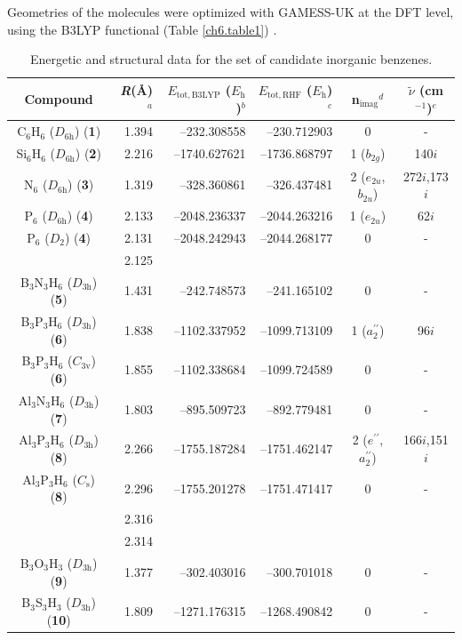 Geometries of the molecules were optimized with GAMESS-UK  \cite{gamess} at the
DFT level, using the B3LYP functional (Table \ref{ch6.table1}) \cite{b3lyp1,b3lyp2,b3lyp3}.
\begin{table}[htp]
\caption{Energetic and structural data for the set of candidate inorganic benzenes.}
\begin{center}
\begin{tabular}{c r r r c c}
\hline
\textbf{Compound}&
\textit{R}(\AA)${}^{a}$& 
$E_{\mathrm{tot,B3LYP}}$ ($E_{\mathrm{h}}$)${ }^{b}$&
$E_{\mathrm{tot,RHF}}$ ($E_{\mathrm{h}}$)${ }^{c}$ &
\mbox{n$_{\mathrm{imag}}$}${}^{d}$ &
$\tilde{\nu}$ (cm$^{-1}$)${}^{e}$\\
\hline
C$_6$H$_6$ ($D_\mathrm{6h}$) (\textbf{1})&1.394&--232.308558& --230.712903&0&-\\
Si$_6$H$_6$ ($D_\mathrm{6h}$) (\textbf{2})&2.216&--1740.627621&--1736.868797&1 ($b_{2g}$)&140$i$\\
N$_6$ ($D_\mathrm{6h}$) (\textbf{3})&1.319&--328.360861& --326.437481&2 ($e_{2u}$, $b_{2u}$)&272$i$,173$i$\\
P$_6$ ($D_\mathrm{6h}$) (\textbf{4})&2.133&--2048.236337&--2044.263216&1 ($e_{2u}$)&62$i$\\
P$_6$ ($D_\mathrm{2}$) (\textbf{4})&2.131&--2048.242943&--2044.268177&0&-\\
&2.125&&&&\\
B$_3$N$_3$H$_6$ ($D_\mathrm{3h}$) (\textbf{5})&1.431&--242.748573& --241.165102&0&-\\
B$_3$P$_3$H$_6$ ($D_\mathrm{3h}$) (\textbf{6})&1.838&--1102.337952&--1099.713109&1 ($a_2^{\prime\prime}$)&96$i$\\
B$_3$P$_3$H$_6$ ($C_\mathrm{3v}$) (\textbf{6})&1.855&--1102.338684&--1099.724589&0&-\\
Al$_3$N$_3$H$_6$ ($D_\mathrm{3h}$) (\textbf{7})&1.803&--895.509723& --892.779481&0&-\\
Al$_3$P$_3$H$_6$ ($D_\mathrm{3h}$) (\textbf{8})&2.266&--1755.187284&--1751.462147&2 ($e^{\prime\prime}$, $a_2^{\prime\prime}$)&166$i$,151$i$\\
Al$_3$P$_3$H$_6$ ($C_\mathrm{s}$) (\textbf{8})&2.296&--1755.201278&--1751.471417&0&-\\
&2.316&&&&\\
&2.314&&&&\\
B$_3$O$_3$H$_3$ ($D_\mathrm{3h}$) (\textbf{9})&1.377&--302.403016& --300.701018&0&-\\
B$_3$S$_3$H$_3$ ($D_\mathrm{3h}$) (\textbf{10})&1.809&--1271.176315&--1268.490842&0&-\\

\end{tabular}
\end{center}
\end{table}
